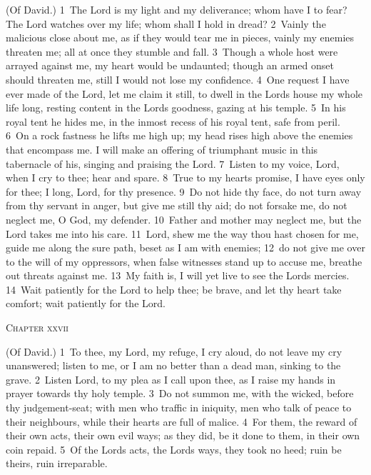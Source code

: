 \documentclass[10pt]{book} %
\begin{document}
(Of David.)
\textcolor{benred8}{1}~The Lord is my light and my deliverance; whom have I to fear? The Lord watches over my life; whom shall I hold in dread? \textcolor{benred8}{2}~Vainly the malicious close about me, as if they would tear me in pieces, vainly my enemies threaten me; all at once they stumble and fall. \textcolor{benred8}{3}~Though a whole host were arrayed against me, my heart would be undaunted; though an armed onset should threaten me, still I would not lose my confidence. \textcolor{benred8}{4}~One request I have ever made of the Lord, let me claim it still, to dwell in the Lord\textquotesingle s house my whole life long, resting content in the Lord\textquotesingle s goodness, gazing at his temple. \textcolor{benred8}{5}~In his royal tent he hides me, in the inmost recess of his royal tent, safe from peril. \textcolor{benred8}{6}~On a rock fastness he lifts me high up; my head rises high above the enemies that encompass me. I will make an offering of triumphant music in this tabernacle of his, singing and praising the Lord.
\textcolor{benred8}{7}~Listen to my voice, Lord, when I cry to thee; hear and spare. \textcolor{benred8}{8}~True to my heart\textquotesingle s promise, I have eyes only for thee; I long, Lord, for thy presence. \textcolor{benred8}{9}~Do not hide thy face, do not turn away from thy servant in anger, but give me still thy aid; do not forsake me, do not neglect me, O God, my defender. \textcolor{benred8}{10}~Father and mother may neglect me, but the Lord takes me into his care. \textcolor{benred8}{11}~Lord, shew me the way thou hast chosen for me, guide me along the sure path, beset as I am with enemies; \textcolor{benred8}{12}~do not give me over to the will of my oppressors, when false witnesses stand up to accuse me, breathe out threats against me. \textcolor{benred8}{13}~My faith is, I will yet live to see the Lord\textquotesingle s mercies. \textcolor{benred8}{14}~Wait patiently for the Lord to help thee; be brave, and let thy heart take comfort; wait patiently for the Lord.
\begin{large}\begin{center}\textsc{Chapter xxvii}\end{center}\end{large}
(Of David.)
\textcolor{benred8}{1}~To thee, my Lord, my refuge, I cry aloud, do not leave my cry unanswered; listen to me, or I am no better than a dead man, sinking to the grave. \textcolor{benred8}{2}~Listen Lord, to my plea as I call upon thee, as I raise my hands in prayer towards thy holy temple. \textcolor{benred8}{3}~Do not summon me, with the wicked, before thy judgement-seat; with men who traffic in iniquity, men who talk of peace to their neighbours, while their hearts are full of malice. \textcolor{benred8}{4}~For them, the reward of their own acts, their own evil ways; as they did, be it done to them, in their own coin repaid. \textcolor{benred8}{5}~Of the Lord\textquotesingle s acts, the Lord\textquotesingle s ways, they took no heed; ruin be theirs, ruin irreparable.
\end{document}

